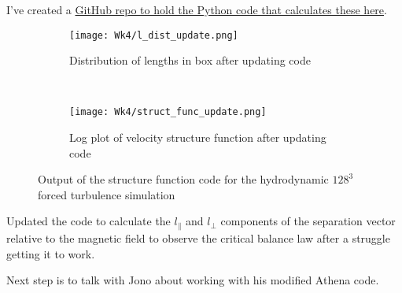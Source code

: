 \documentclass[12pt,letterpaper]{article}
\begin{document}
  I've created a \href{https://github.com/JohnstonZade/python_tools}{GitHub repo to hold the Python code that calculates these here}.

  \begin{figure}[!h]
   \centering
  \begin{subfigure}{.4\linewidth}
    \centering
  \texttt{[image: Wk4/l\_dist\_update.png]}
  \caption{Distribution of lengths in box after updating code}
  \label{fig:l_dist_update}
  \end{subfigure}
  \
  \begin{subfigure}{.4\linewidth}
    \centering
  \texttt{[image: Wk4/struct\_func\_update.png]}
  \caption{Log plot of velocity structure function after updating code}
  \label{fig:struct_func_update}
  \end{subfigure}

  \caption{Output of the structure function code for the hydrodynamic $128^3$ forced turbulence simulation}
  \label{fig:structure_plot_update}
  \end{figure}

  Updated the code to calculate the $l_{\|}$ and $l_\perp$ components of the separation vector relative to the magnetic field to observe the critical balance law after a struggle getting it to work.

  Next step is to talk with Jono about working with his modified Athena code.
\end{document}
